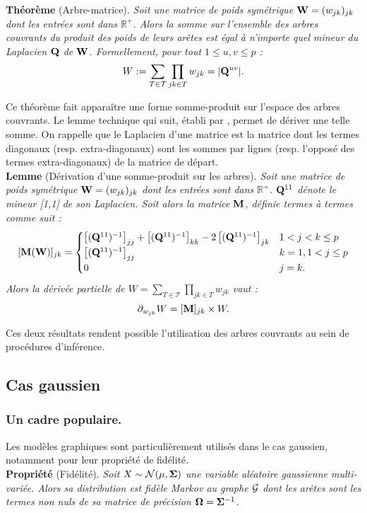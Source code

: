 \textbf{Théorème} (Arbre-matrice). \textit{Soit une matrice de poids symétrique ${\bf W}=(w_{jk})_{jk}$ dont les entrées sont dans $\mathds{R}^+$. Alors la somme sur l'ensemble des arbres couvrants du produit des poids de leurs arêtes est égal à n'importe quel mineur du Laplacien ${\bf Q}$ de ${\bf W}$. Formellement, pour tout $1 \leq u, v \leq p$ :
   \[  W := \sum_{T\in\mathcal{T}} \prod_{jk\in T} w_{jk} = |{\bf Q}^{uv}|.  \]
   }
   
Ce théorème fait apparaître une forme somme-produit sur l'espace des arbres couvrants. Le lemme technique qui suit, établi par \citet{MeilaJaak}, permet de dériver une telle somme. On rappelle que le Laplacien d'une matrice est la matrice dont les termes diagonaux (resp. extra-diagonaux) sont les sommes par lignes (resp. l'opposé des termes extra-diagonaux) de la matrice de départ.\\

\textbf{Lemme} (Dérivation d'une somme-produit sur les arbres). \textit{Soit une matrice de poids symétrique ${\bf W}=(w_{jk})_{jk}$ dont les entrées sont dans $\mathds{R}^+$. ${\bf Q}^{11}$ dénote le mineur [1,1] de son Laplacien. Soit alors la matrice ${\bf M}$, définie termes à termes comme suit :
\[    
 [{\bf M}({\bf W})]_{jk} =\begin{cases}
    \left[({\bf Q}^{11})^{-1}\right]_{jj} + \left[({\bf Q}^{11})^{-1}\right]_{kk} -2\left[({\bf Q}^{11})^{-1}\right]_{jk} & 1< j<k \leq p\\
    \left[({\bf Q}^{11})^{-1}\right]_{jj} & k=1, 1< j \leq p  \\
    0 &  j=k .
    \end{cases}
\] 
Alors la dérivée partielle de $W = \sum_{T\in\mathcal{T}} \prod_{jk\in T} w_{jk}$ vaut :
$$\partial_{w_{jk}} W = [{\bf M}]_{jk}  \times W.$$ }
   
Ces deux résultats rendent possible l'utilisation des arbres couvrants au sein de procédures d'inférence.
\subsection*{Cas gaussien}
\subsubsection*{Un cadre populaire.}
Les modèles graphiques sont particulièrement utilisés dans le cas gaussien, notamment pour leur propriété de fidélité.\\

\textbf{Propriété} (Fidélité). \textit{Soit $X\sim \mathcal{N}(\mu, {\boldsymbol{\Sigma}})$ une variable aléatoire gaussienne multi-variée. Alors sa distribution est fidèle Markov au graphe $\mathcal{G}$ dont les arêtes sont les termes non nuls de sa matrice de précision ${\boldsymbol{\Omega}} = {\boldsymbol{\Sigma}}^{-1}$.\\}
  
